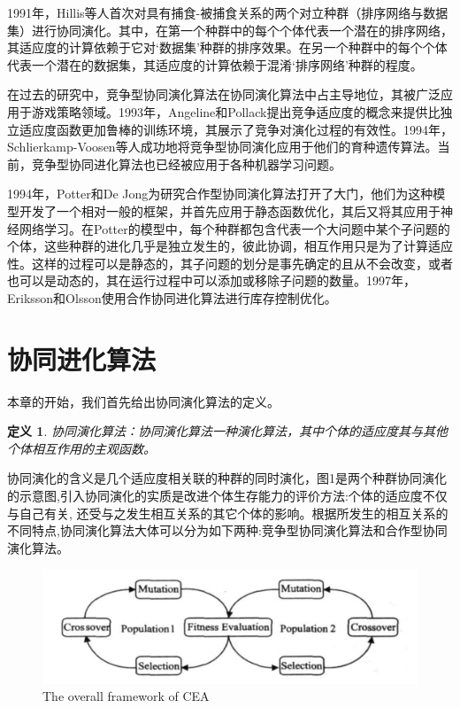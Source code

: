 \documentclass[a4paper]{article}
\newtheorem{definition}{\hspace{2em}定义}
\begin{document}
    1991年，Hillis等人首次对具有捕食-被捕食关系的两个对立种群（排序网络与数据集）进行协同演化\cite{hillis1990co}。其中，在第一个种群中的每个个体代表一个潜在的排序网络，其适应度的计算依赖于它对‘数据集’种群的排序效果。在另一个种群中的每个个体代表一个潜在的数据集，其适应度的计算依赖于混淆‘排序网络’种群的程度。
    
    在过去的研究中，竞争型协同演化算法在协同演化算法中占主导地位，其被广泛应用于游戏策略领域\cite{rosin1995methods,pollack1998co}。1993年，Angeline和Pollack提出竞争适应度的概念来提供比独立适应度函数更加鲁棒的训练环境，其展示了竞争对演化过程的有效性。1994年，Schlierkamp-Voosen等人成功地将竞争型协同演化应用于他们的育种遗传算法。当前，竞争型协同进化算法也已经被应用于各种机器学习问题。
    
    1994年，Potter和De Jong为研究合作型协同演化算法打开了大门\cite{potter1994cooperative}，他们为这种模型开发了一个相对一般的框架，并首先应用于静态函数优化，其后又将其应用于神经网络学习。在Potter的模型中，每个种群都包含代表一个大问题中某个子问题的个体，这些种群的进化几乎是独立发生的，彼此协调，相互作用只是为了计算适应性。这样的过程可以是静态的，其子问题的划分是事先确定的且从不会改变，或者也可以是动态的，其在运行过程中可以添加或移除子问题的数量。1997年，Eriksson和Olsson使用合作协同进化算法进行库存控制优化。


    \newpage
    \section{协同进化算法}

    本章的开始，我们首先给出协同演化算法的定义。
    
    \begin{definition}
        协同演化算法：协同演化算法一种演化算法，其中个体的适应度其与其他个体相互作用的主观函数。
    \end{definition}

    协同演化的含义是几个适应度相关联的种群的同时演化，图1是两个种群协同演化的示意图,引入协同演化的实质是改进个体生存能力的评价方法:个体的适应度不仅与自己有关, 还受与之发生相互关系的其它个体的影响。根据所发生的相互关系的不同特点,协同演化算法大体可以分为如下两种:竞争型协同演化算法和合作型协同演化算法。

    \begin{figure}[H]
        \centering
        \includegraphics[width=0.8\linewidth]{./images/cea_framework.png}
        \caption{The overall framework of CEA}
        \label{fig:cea_framework}
    \end{figure}
\end{document}
